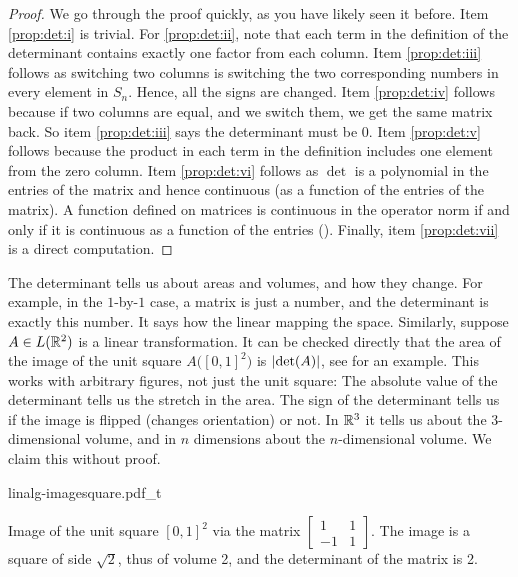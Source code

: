 \begin{proof}
We go through the proof quickly, as you have likely seen it before.
%
Item \ref{prop:det:i} is trivial.  For \ref{prop:det:ii}, note that each term in the definition of the
determinant contains exactly one factor from each column.
%
Item \ref{prop:det:iii} follows as switching two columns is switching the
two corresponding numbers in every element in $S_n$.  Hence, all the signs
are changed.
Item \ref{prop:det:iv} follows because if two columns are equal, and we
switch them, we get
the same matrix back.  So item \ref{prop:det:iii} says the determinant must be 0.
%
Item \ref{prop:det:v} follows because the product in each term in the definition includes
one element from the zero column.
Item \ref{prop:det:vi} follows as $\det$ is a polynomial in the entries of the matrix
and hence continuous (as a function of the entries of the matrix).
A function defined on
matrices is continuous in the operator norm if and only if it is 
continuous as a function of the entries ().
Finally, item \ref{prop:det:vii} is a direct computation.
\end{proof}

The determinant tells us about areas and volumes, and how they change.
For example, in the $1$-by-$1$ case, a matrix is just a number, and the
determinant is exactly this number.  It says how the linear mapping
 the space.  Similarly,
suppose $A \in L({\mathbb{R}}^2)$ is a linear transformation.
It can be checked directly that
the area of the image of the unit square $A\bigl([0,1]^2\bigr)$ is
$\lvert {\det(A)} \rvert$, see  for an example.
This works with arbitrary figures, not just the unit
square:
The absolute value of the determinant tells us the stretch in the area.
The sign of the determinant tells us if the image is
flipped (changes orientation) or not.
In ${\mathbb{R}}^3$ it
tells us about the 3-dimensional volume, and in $n$ dimensions about the
$n$-dimensional volume.  We claim this without proof.
\begin{myfigureht}
{linalg-imagesquare.pdf_t}
\caption{Image of the unit square ${[0,1]}^2$ via the matrix
$\left[\begin{smallmatrix}1 & 1 \\ -1 & 1\end{smallmatrix}\right]$.
The image is a square of side $\sqrt{2}$, thus of volume 2, and the determinant of the
matrix is 2.\label{fig:imagesquare}}
\end{myfigureht}


